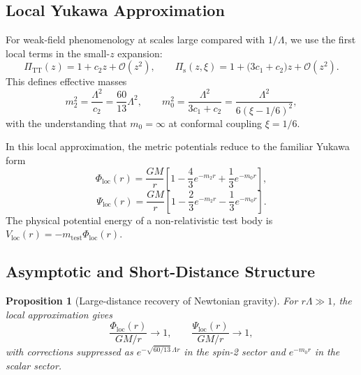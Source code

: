 \documentclass[11pt,a4paper]{article}
\theoremstyle{plain}
\newtheorem{proposition}[theorem]{Proposition}
\theoremstyle{definition}
\begin{document}
\subsection{Local Yukawa Approximation}

For weak-field phenomenology at scales large compared with $1/\Lambda$,
we use the first local terms in the small-$z$ expansion:
\begin{equation}
  \Pi_{\mathrm{TT}}(z) = 1 + c_2 z + \mathcal{O}(z^2),
  \qquad
  \Pi_{\mathrm{s}}(z,\xi) = 1 + \bigl(3c_1 + c_2\bigr) z + \mathcal{O}(z^2).
\end{equation}
This defines effective masses
\begin{equation}\label{eq:m2-local}
  m_2^2 = \frac{\Lambda^2}{c_2}
  = \frac{60}{13}\Lambda^2,
  \qquad
  m_0^2 = \frac{\Lambda^2}{3c_1 + c_2}
  = \frac{\Lambda^2}{6(\xi - 1/6)^2},
\end{equation}
with the understanding that $m_0 = \infty$ at conformal coupling
$\xi = 1/6$.

In this local approximation, the metric potentials reduce to the familiar
Yukawa form
\begin{equation}\label{eq:Phi-local}
  \Phi_{\mathrm{loc}}(r)
  = \frac{GM}{r}\left[
    1 - \frac{4}{3}e^{-m_2 r} + \frac{1}{3}e^{-m_0 r}
  \right],
\end{equation}
\begin{equation}\label{eq:Psi-local}
  \Psi_{\mathrm{loc}}(r)
  = \frac{GM}{r}\left[
    1 - \frac{2}{3}e^{-m_2 r} - \frac{1}{3}e^{-m_0 r}
  \right].
\end{equation}
The physical potential energy of a non-relativistic test body is
$V_{\mathrm{loc}}(r) = -m_{\mathrm{test}}\Phi_{\mathrm{loc}}(r)$.

\subsection{Asymptotic and Short-Distance Structure}

\begin{proposition}[Large-distance recovery of Newtonian gravity]
For $r\Lambda \gg 1$, the local approximation gives
\begin{equation}\label{eq:V-asymp}
  \frac{\Phi_{\mathrm{loc}}(r)}{GM/r} \to 1,
  \qquad
  \frac{\Psi_{\mathrm{loc}}(r)}{GM/r} \to 1,
\end{equation}
with corrections suppressed as
$e^{-\sqrt{60/13}\,\Lambda r}$ in the spin-2 sector and
$e^{-m_0 r}$ in the scalar sector.
\end{proposition}
\end{document}
